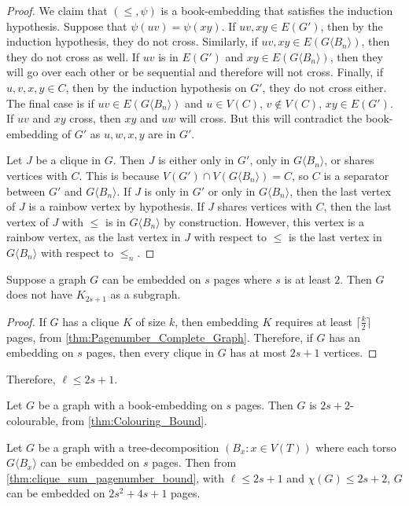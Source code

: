 \begin{proof}
	We claim that \((\leq , \psi)\) is a book-embedding that satisfies the induction hypothesis. Suppose that \(\psi(uv) = \psi(xy)\). If \(uv, xy \in E(G')\), then by the induction hypothesis, they do not cross. Similarly, if \(uv, xy \in E(G \langle B_n \rangle)\), then they do not cross as well. If \(uv\) is in \(E(G')\) and \(xy \in E(G \langle B_n \rangle)\), then they will go over each other or be sequential and therefore will not cross.
	Finally, if \(u, v, x, y \in C\), then by the induction hypothesis on \(G'\), they do not cross either. The final case is if \(uv \in E(G\langle B_{n} \rangle)\) and \(u \in V(C)\), \(v \notin V(C)\), \(xy \in E(G')\). If \(uv\) and \(xy\) cross, then \(xy\) and \(uw\) will cross. But this will contradict the book-embedding of \(G'\) as $u, w, x, y$ are in $G'$.

	Let \(J\) be a clique in \(G\). Then $J$ is either only in $G'$, only in $G\langle B_n \rangle$, or shares vertices with $C$. This is because $V(G') \cap V(G\langle B_n \rangle) = C$, so $C$ is a separator between $G'$ and $G \langle B_n \rangle$. If $J$ is only in $G'$ or only in $G\langle B_n \rangle$, then the last vertex of $J$ is a rainbow vertex by hypothesis. If $J$ shares vertices with $C$, then the last vertex of $J$ with $\leq$ is in $G\langle B_n \rangle$ by construction. However, this vertex is a rainbow vertex, as the last vertex in $J$ with respect to $\leq$ is the last vertex in $G\langle B_n \rangle$ with respect to $\leq_n$. 
\end{proof}

\begin{lemma}
	Suppose a graph $G$ can be embedded on $s$ pages where $s$ is at least $2$. Then \(G\) does not have $K_{2s + 1}$ as a subgraph.
\end{lemma}

\begin{proof}
	If \(G\) has a clique $K$ of size \(k\), then embedding $K$ requires at least \(\lceil \frac{k}{2} \rceil\) pages, from \cref{thm:Pagenumber_Complete_Graph}. Therefore, if \(G\) has an embedding on \(s\) pages, then every clique in $G$ has at most \(2s + 1\) vertices.
\end{proof}
Therefore, \(\ell \leq 2s + 1\).

Let $G$ be a graph with a book-embedding on $s$ pages. Then $G$ is $2s + 2$-colourable, from \cref{thm:Colouring_Bound}.
\begin{corollary}\label{corr:bded_pn_tree_decomp}
	Let \(G\) be a graph with a tree-decomposition \((B_x: x \in V(T))\) where each torso \(G \langle B_x \rangle\) can be embedded on $s$ pages. Then from \cref{thm:clique_sum_pagenumber_bound}, with $\ell \leq 2s + 1$ and $\chi(G) \leq 2 s + 2$, \(G\) can be embedded on \(2s^2 + 4s + 1\) pages.
\end{corollary}

